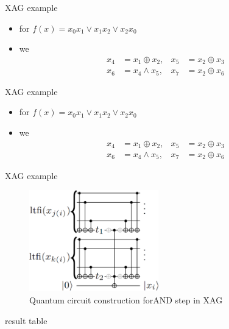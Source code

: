 \documentclass[aspectratio=1610]{beamer}
\begin{document}
\begin{frame}{XAG example}
  \begin{itemize}
    \item for $f(x)=x_0x_1\vee x_1x_2\vee x_2x_0$
    \item we 
    \begin{align}
      x_{4} & = x_{1} \oplus x_{2}, & x_{5} & = x_{2} \oplus x_{3} \\
      x_{6} & = x_{4} \wedge x_{5}, & x_{7} & = x_{2} \oplus x_{6}
    \end{align}
  \end{itemize}
\end{frame}
\begin{frame}{XAG example}
  \begin{itemize}
    \item for $f(x)=x_0x_1\vee x_1x_2\vee x_2x_0$
    \item we 
    \begin{align}
      x_{4} & = x_{1} \oplus x_{2}, & x_{5} & = x_{2} \oplus x_{3} \\
      x_{6} & = x_{4} \wedge x_{5}, & x_{7} & = x_{2} \oplus x_{6}
    \end{align}
  \end{itemize}
\end{frame}
\begin{frame}{XAG example}
  \begin{figure}[htbq]
    \centering
    \includegraphics[width=0.5\textwidth]{figure/construction.png}
    \caption{Quantum circuit construction forAND step in XAG} 
    \label{fig-qsp-example-circuit}
  \end{figure}
\end{frame}
\begin{frame}{result}
  table   
\end{frame}
\end{document}
